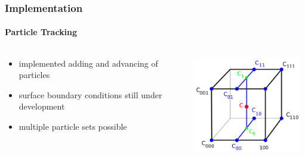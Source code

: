\documentclass{beamer}
\begin{document}
\begin{frame}
\frametitle{Implementation}
\framesubtitle{Particle Tracking}

\begin{columns}
\begin{column}{0.45\textwidth}
\begin{itemize}
\item implemented adding and advancing of particles
\item surface boundary conditions still under development
\item multiple particle sets possible 
\end{itemize}
\end{column}
\begin{column}{0.45\textwidth}
\includegraphics[width = 0.95\textwidth]{interpol.png}
\end{column}
\end{columns}
\end{frame}



\end{document}
